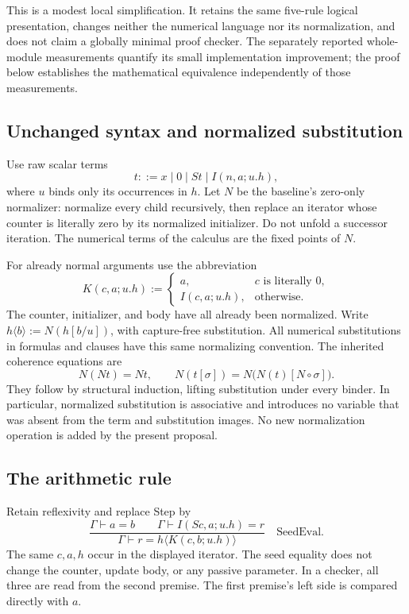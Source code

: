 \documentclass[11pt,letterpaper]{article}
\begin{document}
This is a modest local simplification.  It retains the same five-rule
logical presentation, changes neither the numerical language nor its
normalization, and does not claim a globally minimal proof checker.
The separately reported whole-module measurements quantify its small
implementation improvement; the proof below establishes the mathematical
equivalence independently of those measurements.

\subsection{Unchanged syntax and normalized substitution}

Use raw scalar terms
\[
 t::=x\mid0\mid St\mid I(n,a;u.h),
\]
where $u$ binds only its occurrences in $h$.  Let $N$ be the baseline's
zero-only normalizer: normalize every child recursively, then replace
an iterator whose counter is literally zero by its normalized
initializer.  Do not unfold a successor iteration.  The numerical terms
of the calculus are the fixed points of $N$.

For already normal arguments use the abbreviation
\[
 K(c,a;u.h):=
 \begin{cases}
 a,&c\text{ is literally }0,\\
 I(c,a;u.h),&\text{otherwise}.
 \end{cases}
\]
The counter, initializer, and body have all already been normalized.
Write $h\langle b\rangle:=N(h[b/u])$, with capture-free substitution.
All numerical substitutions in formulas and clauses have this same
normalizing convention.  The inherited coherence equations are
\[
 N(Nt)=Nt,\qquad
 N(t[\sigma])=N\bigl(N(t)[N\circ\sigma]\bigr).
\]
They follow by structural induction, lifting substitution under every
binder.  In particular, normalized substitution is associative and
introduces no variable that was absent from the term and substitution
images.  No new normalization operation is added by the present proposal.

\subsection{The arithmetic rule}

Retain reflexivity and replace Step by
\[
 \boxed{\quad
 \frac{\Gamma\vdash a=b\qquad
       \Gamma\vdash I(Sc,a;u.h)=r}
      {\Gamma\vdash r=h\langle K(c,b;u.h)\rangle}
       \quad\mathrm{SeedEval}.\quad}
 \tag{SeedEval}
\]
The same $c,a,h$ occur in the displayed iterator.  The seed equality
does not change the counter, update body, or any passive parameter.
In a checker, all three are read from the second premise.  The first
premise's left side is compared directly with $a$.
\end{document}
